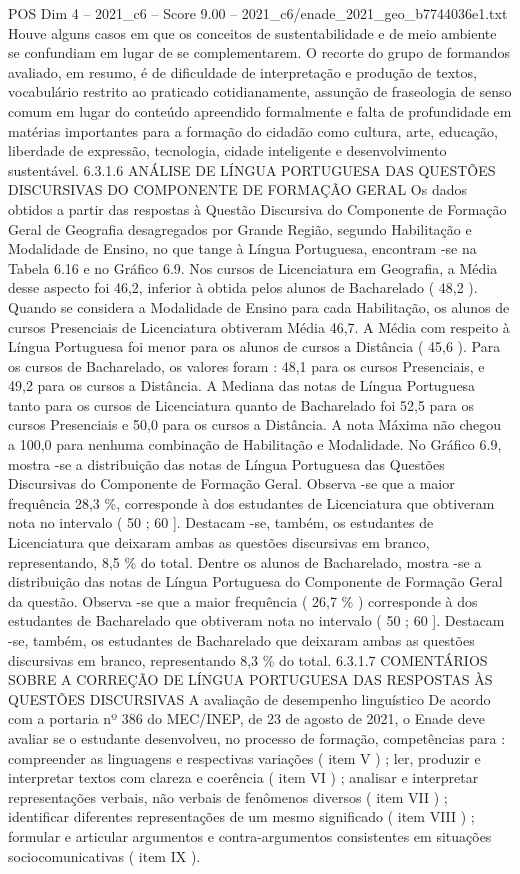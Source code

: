 \begin{textsample}{POS Dim 4 – 2021\_c6 – Score 9.00 – 2021\_c6/enade\_2021\_geo\_b7744036e1.txt}
Houve alguns casos em que os conceitos de sustentabilidade e de meio ambiente se confundiam em lugar de se complementarem.
O recorte do grupo de formandos avaliado, em resumo, é de dificuldade de interpretação e produção de textos, vocabulário restrito ao praticado cotidianamente, assunção de fraseologia de senso comum em lugar do conteúdo apreendido formalmente e falta de profundidade em matérias importantes para a formação do cidadão como cultura, arte, educação, liberdade de expressão, tecnologia, cidade inteligente e desenvolvimento sustentável. 6.3.1.6 ANÁLISE DE LÍNGUA PORTUGUESA DAS QUESTÕES DISCURSIVAS DO COMPONENTE DE FORMAÇÃO GERAL Os dados obtidos a partir das respostas à Questão Discursiva do Componente de Formação Geral de Geografia desagregados por Grande Região, segundo Habilitação e Modalidade de Ensino, no que tange à Língua Portuguesa, encontram -se na Tabela 6.16 e no Gráfico 6.9.
Nos cursos de Licenciatura em Geografia, a Média desse aspecto foi 46,2, inferior à obtida pelos alunos de Bacharelado ( 48,2 ).
Quando se considera a Modalidade de Ensino para cada Habilitação, os alunos de cursos Presenciais de Licenciatura obtiveram Média 46,7.
A Média com respeito à Língua Portuguesa foi menor para os alunos de cursos a Distância ( 45,6 ).
Para os cursos de Bacharelado, os valores foram : 48,1 para os cursos Presenciais, e 49,2 para os cursos a Distância.
A Mediana das notas de Língua Portuguesa tanto para os cursos de Licenciatura quanto de Bacharelado foi 52,5 para os cursos Presenciais e 50,0 para os cursos a Distância.
A nota Máxima não chegou a 100,0 para nenhuma combinação de Habilitação e Modalidade.
No Gráfico 6.9, mostra -se a distribuição das notas de Língua Portuguesa das Questões Discursivas do Componente de Formação Geral.
Observa -se que a maior frequência 28,3 \%, corresponde à dos estudantes de Licenciatura que obtiveram nota no intervalo ( 50 ; 60 ].
Destacam -se, também, os estudantes de Licenciatura que deixaram ambas as questões discursivas em branco, representando, 8,5 \% do total.
Dentre os alunos de Bacharelado, mostra -se a distribuição das notas de Língua Portuguesa do Componente de Formação Geral da questão.
Observa -se que a maior frequência ( 26,7 \% ) corresponde à dos estudantes de Bacharelado que obtiveram nota no intervalo ( 50 ; 60 ].
Destacam -se, também, os estudantes de Bacharelado que deixaram ambas as questões discursivas em branco, representando 8,3 \% do total. 6.3.1.7 COMENTÁRIOS SOBRE A CORREÇÃO DE LÍNGUA PORTUGUESA DAS RESPOSTAS ÀS QUESTÕES DISCURSIVAS A avaliação de desempenho linguístico De acordo com a portaria nº 386 do MEC/INEP, de 23 de agosto de 2021, o Enade deve avaliar se o estudante desenvolveu, no processo de formação, competências para : compreender as linguagens e respectivas variações ( item V ) ; ler, produzir e interpretar textos com clareza e coerência ( item VI ) ; analisar e interpretar representações verbais, não verbais de fenômenos diversos ( item VII ) ; identificar diferentes representações de um mesmo significado ( item VIII ) ; formular e articular argumentos e contra-argumentos consistentes em situações sociocomunicativas ( item IX ).

\end{textsample}
